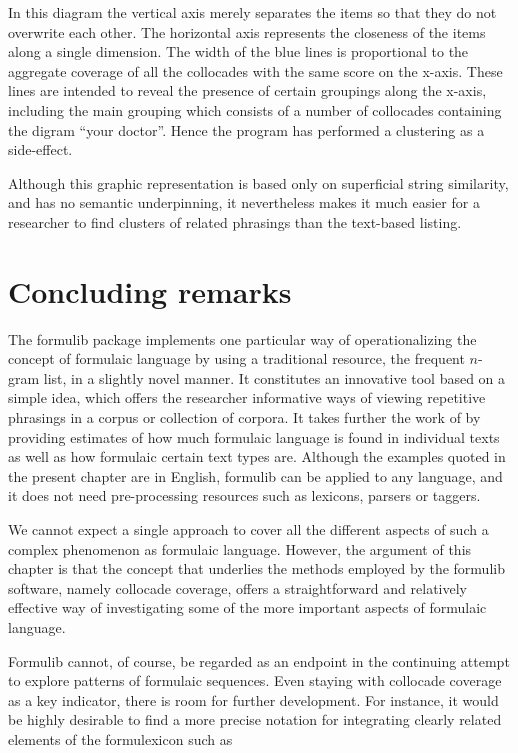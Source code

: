 \documentclass[output=paper]{langscibook}
\begin{document}
In this diagram the vertical axis merely separates the items so that they do not overwrite each other. The horizontal axis represents the closeness of the items along a single dimension. The width of the blue lines is proportional to the aggregate coverage of all the collocades with the same score on the x-axis. These lines are intended to reveal the presence of certain groupings along the x-axis, including the main grouping which consists of a number of collocades containing the digram ``your doctor''. Hence the program has performed a clustering as a side-effect.

Although this graphic representation is based only on superficial string similarity, and has no semantic underpinning, it nevertheless makes it much easier for a researcher to find clusters of related phrasings than the text-based listing.

\section{Concluding remarks}\label{sec:forsyth:8}
\largerpage
The formulib package implements one particular way of operationalizing the concept of formulaic language by using a traditional resource, the frequent $n$-gram list, in a slightly novel manner. It constitutes an innovative tool based on a simple idea, which offers the researcher informative ways of viewing repetitive phrasings in a corpus or collection of corpora. It takes further the work of \citet{ForsythGrabowski2015} by providing estimates of how much formulaic language is found in individual texts as well as how formulaic certain text types are. Although the examples quoted in the present chapter are in English, formulib can be applied to any language, and it does not need pre-processing resources such as lexicons, parsers or taggers.

We cannot expect a single approach to cover all the different aspects of such a complex phenomenon as formulaic language. However, the argument of this chapter is that the concept that underlies the methods employed by the formulib software, namely collocade coverage, offers a straightforward and relatively effective way of investigating some of the more important aspects of formulaic language.

Formulib cannot, of course, be regarded as an endpoint in the continuing attempt to explore patterns of formulaic sequences. Even staying with collocade coverage as a key indicator, there is room for further development. For instance, it would be highly desirable to find a more precise notation for integrating clearly related elements of the formulexicon such as
\end{document}
